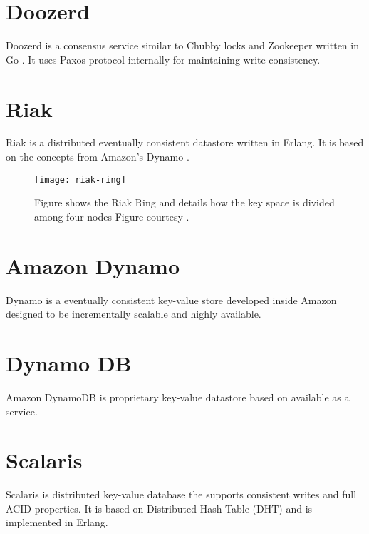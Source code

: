 \section{Doozerd}

Doozerd \citep{doozerd} is a consensus service similar to Chubby locks
 and Zookeeper  written in 
Go \citep{golang}. It uses Paxos protocol internally for maintaining
write consistency.

\section{Riak}

Riak \citep{riak} is a distributed eventually consistent datastore written in 
Erlang. It is based on the concepts from Amazon's Dynamo \citep{DeCandia07}.

\begin{figure}
  \texttt{[image: riak-ring]}
  \caption[Riak Ring]{%
    Figure shows the Riak Ring and details how the key space is divided among 
    four nodes
    Figure courtesy \citet{riak}.}
  \label{figure:megastore}
\end{figure}


\section{Amazon Dynamo}

Dynamo \citep{DeCandia07} is a eventually consistent key-value store developed 
inside Amazon designed to be incrementally scalable and highly available.

\section{Dynamo DB}

Amazon DynamoDB \citep{dynamoDB} is proprietary key-value datastore based on
\citet{DeCandia07} available as a service.

\section{Scalaris}

Scalaris \citep{scalaris} is distributed key-value database the supports
consistent writes and full ACID properties. It is based on Distributed Hash
Table (DHT)%
and is implemented in Erlang.



